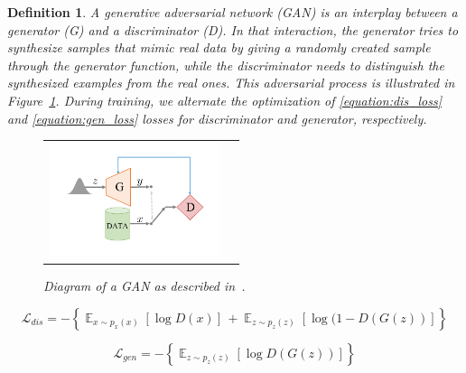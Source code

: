 \documentclass[12pt]{article}
\newtheorem{definition}{Definition}
\begin{document}
    \begin{definition}
        \normalfont
        A \emph{generative adversarial network} (GAN) \cite{NIPS2014_5ca3e9b1} is an interplay between a \emph{generator} (G) and a \emph{discriminator} (D).
        In that interaction, the generator tries to synthesize samples that mimic real data by giving a randomly created sample through the generator function, while the discriminator needs to distinguish the synthesized examples from the real ones. This adversarial process is illustrated in Figure~\ref{figure:diagram_of_gan}. During training, we alternate the optimization of   \eqref{equation:dis_loss} and \eqref{equation:gen_loss} losses for discriminator and generator, respectively.

        \begin{figure}[H]
            \centering
            \begin{tabular}{cc}
                \includegraphics[width = 50mm]{gan}
            \end{tabular}
            \caption{Diagram of a GAN as described in~\cite{pmlr-v80-achlioptas18a}.}
            \label{figure:diagram_of_gan}
        \end{figure}

        \begin{equation}
            \mathcal{L}_{dis} = -\left\{ \mathop{\mathbb{E}}_{x \sim p_x(x)}[\log D(x)]\,+ \mathop{\mathbb{E}}_{z \sim p_z(z)}[\log (1 - D(G(z))]\right\}
            \label{equation:dis_loss}
        \end{equation}

        \begin{equation}
            \mathcal{L}_{gen} = -\left\{\mathop{\mathbb{E}}_{z \sim p_z(z)}[\log D(G(z))]\right\}
            \label{equation:gen_loss}
        \end{equation}

        \label{definition:GAN}
    \end{definition}
\end{document}
